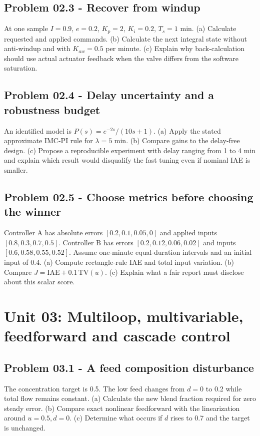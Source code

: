 \documentclass[11pt,a4paper]{article}
\begin{document}
\subsection{Problem 02.3 - Recover from windup}
At one sample $I=0.9$, $e=0.2$, $K_p=2$, $K_i=0.2$, $T_s=1$ min. (a) Calculate requested and applied commands. (b) Calculate the next integral state without anti-windup and with $K_{aw}=0.5$ per minute. (c) Explain why back-calculation should use actual actuator feedback when the valve differs from the software saturation.

\subsection{Problem 02.4 - Delay uncertainty and a robustness budget}
An identified model is $P(s)=e^{-2s}/(10s+1)$. (a) Apply the stated approximate IMC-PI rule for $\lambda=5$ min. (b) Compare gains to the delay-free design. (c) Propose a reproducible experiment with delay ranging from 1 to 4 min and explain which result would disqualify the fast tuning even if nominal IAE is smaller.

\subsection{Problem 02.5 - Choose metrics before choosing the winner}
Controller A has absolute errors $[0.2,0.1,0.05,0]$ and applied inputs $[0.8,0.3,0.7,0.5]$. Controller B has errors $[0.2,0.12,0.06,0.02]$ and inputs $[0.6,0.58,0.55,0.52]$. Assume one-minute equal-duration intervals and an initial input of 0.4. (a) Compute rectangle-rule IAE and total input variation. (b) Compare $J=\mathrm{IAE}+0.1\,\mathrm{TV}(u)$. (c) Explain what a fair report must disclose about this scalar score.


\clearpage\section{Unit 03: Multiloop, multivariable, feedforward and cascade control}

\subsection{Problem 03.1 - A feed composition disturbance}
The concentration target is 0.5. The low feed changes from $d=0$ to 0.2 while total flow remains constant. (a) Calculate the new blend fraction required for zero steady error. (b) Compare exact nonlinear feedforward with the linearization around $u=0.5,d=0$. (c) Determine what occurs if $d$ rises to 0.7 and the target is unchanged.
\end{document}
